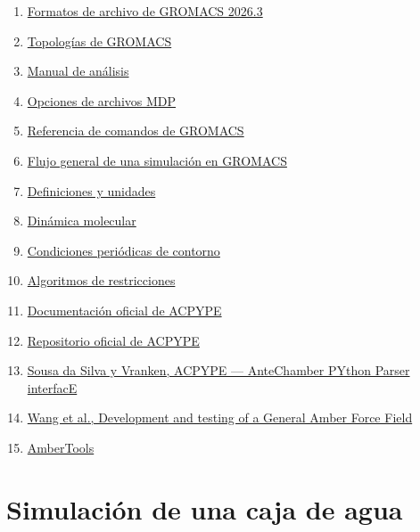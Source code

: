 \documentclass[
  spanish,
  11pt,
  a4paper]{article}
\providecommand{\tightlist}{%
  \setlength{\itemsep}{0pt}\setlength{\parskip}{0pt}}
\begin{document}
\begin{enumerate}
\def\labelenumi{\arabic{enumi}.}
\tightlist
\item
  \href{https://manual.gromacs.org/current/reference-manual/file-formats.html}{Formatos
  de archivo de GROMACS 2026.3}
\item
  \href{https://manual.gromacs.org/current/reference-manual/topologies/topologies.html}{Topologías
  de GROMACS}
\item
  \href{https://manual.gromacs.org/current/reference-manual/analysis/analysis.html}{Manual
  de análisis}
\item
  \href{https://manual.gromacs.org/current/user-guide/mdp-options.html}{Opciones
  de archivos MDP}
\item
  \href{https://manual.gromacs.org/current/onlinehelp/gmx.html}{Referencia
  de comandos de GROMACS}
\item
  \href{https://manual.gromacs.org/current/user-guide/flow.html}{Flujo
  general de una simulación en GROMACS}
\item
  \href{https://manual.gromacs.org/current/reference-manual/definitions.html}{Definiciones
  y unidades}
\item
  \href{https://manual.gromacs.org/current/reference-manual/algorithms/molecular-dynamics.html}{Dinámica
  molecular}
\item
  \href{https://manual.gromacs.org/current/reference-manual/algorithms/periodic-boundary-conditions.html}{Condiciones
  periódicas de contorno}
\item
  \href{https://manual.gromacs.org/current/reference-manual/algorithms/constraint-algorithms.html}{Algoritmos
  de restricciones}
\item
  \href{https://alanwilter.github.io/acpype/}{Documentación oficial de
  ACPYPE}
\item
  \href{https://github.com/alanwilter/acpype}{Repositorio oficial de
  ACPYPE}
\item
  \href{https://doi.org/10.1186/1756-0500-5-367}{Sousa da Silva y
  Vranken, ACPYPE --- AnteChamber PYthon Parser interfacE}
\item
  \href{https://doi.org/10.1002/jcc.20035}{Wang et al., Development and
  testing of a General Amber Force Field}
\item
  \href{https://ambermd.org/AmberTools.php}{AmberTools}
\end{enumerate}

\section{Simulación de una caja de
agua}\label{simulaciuxf3n-de-una-caja-de-agua}
\end{document}
